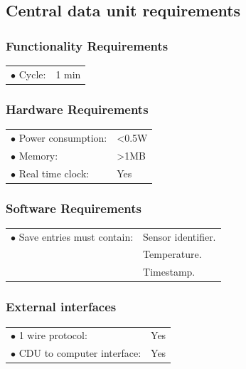 \subsection{Central data unit requirements}

\subsubsection{Functionality Requirements}
\begin{table}[H]
\begin{tabular}{p{8cm} p{2cm}}
$\bullet$ Cycle\footnotemark: & 1 min\\
\end{tabular}
\end{table}
\subsubsection{Hardware Requirements}
\begin{table}[H]
\begin{tabular}{p{8cm} p{2cm}}
$\bullet$ Power consumption: & <0.5W \footnotemark \\
$\bullet$ Memory: & >1MB\footnotemark\\
$\bullet$ Real time clock: & Yes\\
\end{tabular}
\end{table}

\subsubsection{Software Requirements}
\begin{table}[H]
\begin{tabular}{p{8cm} p{5cm}}
$\bullet$ Save entries must contain: &Sensor identifier. \\
~ 									&Temperature. \\
~									&Timestamp. \\


\end{tabular}
\end{table}


\subsubsection{External interfaces}
\begin{table}[H]
\begin{tabular}{p{8cm} p{2cm}}
$\bullet$ 1 wire protocol: & Yes\\
$\bullet$ CDU to computer interface: & Yes\\
\end{tabular}
\end{table}

